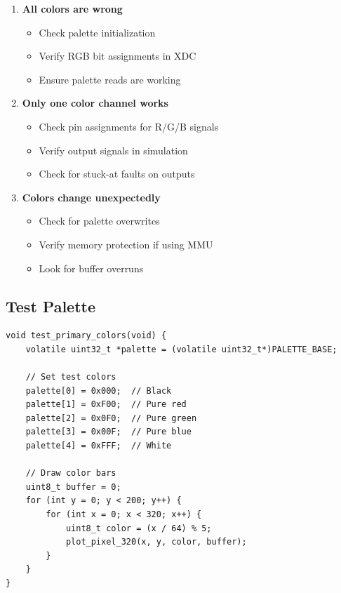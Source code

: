 \documentclass[11pt,letterpaper]{report}
\begin{document}
\begin{enumerate}
    \item \textbf{All colors are wrong}
    \begin{itemize}
        \item Check palette initialization
        \item Verify RGB bit assignments in XDC
        \item Ensure palette reads are working
    \end{itemize}
    
    \item \textbf{Only one color channel works}
    \begin{itemize}
        \item Check pin assignments for R/G/B signals
        \item Verify output signals in simulation
        \item Check for stuck-at faults on outputs
    \end{itemize}
    
    \item \textbf{Colors change unexpectedly}
    \begin{itemize}
        \item Check for palette overwrites
        \item Verify memory protection if using MMU
        \item Look for buffer overruns
    \end{itemize}
\end{enumerate}

\subsection{Test Palette}

\begin{lstlisting}[style=c,caption={Test Basic Colors}]
void test_primary_colors(void) {
    volatile uint32_t *palette = (volatile uint32_t*)PALETTE_BASE;
    
    // Set test colors
    palette[0] = 0x000;  // Black
    palette[1] = 0xF00;  // Pure red
    palette[2] = 0x0F0;  // Pure green
    palette[3] = 0x00F;  // Pure blue
    palette[4] = 0xFFF;  // White
    
    // Draw color bars
    uint8_t buffer = 0;
    for (int y = 0; y < 200; y++) {
        for (int x = 0; x < 320; x++) {
            uint8_t color = (x / 64) % 5;
            plot_pixel_320(x, y, color, buffer);
        }
    }
}
\end{lstlisting}
\end{document}
